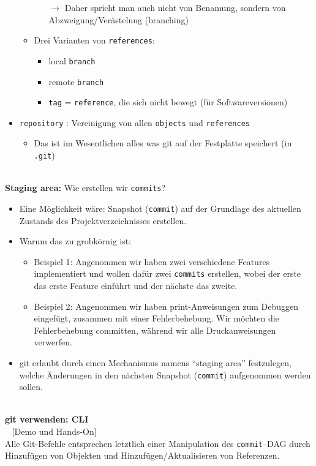 \begin{itemize}
\begin{itemize}
\begin{itemize}
			$\rightarrow$ Daher spricht man auch nicht von Benamung, sondern von Abzweigung/Verästelung (branching)
		\end{itemize}
		\item Drei Varianten von \texttt{references}:
		\begin{itemize}
			\item local \texttt{branch}
			\item remote \texttt{branch}
			\item \texttt{tag} = \texttt{reference}, die sich nicht bewegt (für Softwareversionen)
		\end{itemize}
	\end{itemize}
	\item \texttt{repository} : Vereinigung von allen \texttt{objects} und \texttt{references}
	\begin{itemize}
		\item Das ist im Wesentlichen alles was git auf der Festplatte speichert (in \texttt{.git})
	\end{itemize}
\end{itemize}
~\\
\textbf{Staging area:} Wie erstellen wir \texttt{commits}? 
\begin{itemize}
	\item Eine Möglichkeit wäre: Snapshot (\texttt{commit}) auf der Grundlage des aktuellen Zustands des Projektverzeichnisses erstellen.
	\item Warum das zu grobkörnig ist:
	\begin{itemize}
		\item Beispiel 1: Angenommen wir haben zwei verschiedene Features implementiert und wollen dafür zwei \texttt{commits} erstellen, wobei der erste das erste Feature einführt und der nächste das zweite. 
		\item Beispiel 2: Angenommen wir haben print-Anweisungen zum Debuggen eingefügt, zusammen mit einer Fehlerbehebung. Wir möchten die Fehlerbehebung committen, während wir alle Druckanweisungen verwerfen.
	\end{itemize}
\item git erlaubt durch einen Mechanismus namens ``staging area'' festzulegen, welche Änderungen in den nächsten Snapshot (\texttt{commit}) aufgenommen werden sollen.
\end{itemize} 

~\\
\textbf{git verwenden: CLI}\\~
[Demo und Hands-On]\\
Alle Git-Befehle entsprechen letztlich einer Manipulation des \texttt{commit}--DAG durch Hinzufügen von Objekten und Hinzufügen/Aktualisieren von Referenzen.


